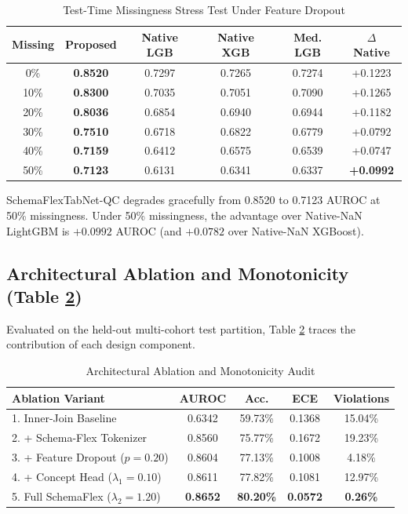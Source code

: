 \documentclass[journal]{IEEEtran}
\begin{document}
\begin{table}[t]
\caption{Test-Time Missingness Stress Test Under Feature Dropout}
\label{tab:missingness_stress}
\centering
\begin{tabular}{cccccc}
\toprule
\textbf{Missing} & \textbf{Proposed} & \textbf{Native LGB} & \textbf{Native XGB} & \textbf{Med. LGB} & \textbf{$\Delta$ Native} \\
\midrule
0\%  & \textbf{0.8520} & 0.7297 & 0.7265 & 0.7274 & +0.1223 \\
10\% & \textbf{0.8300} & 0.7035 & 0.7051 & 0.7090 & +0.1265 \\
20\% & \textbf{0.8036} & 0.6854 & 0.6940 & 0.6944 & +0.1182 \\
30\% & \textbf{0.7510} & 0.6718 & 0.6822 & 0.6779 & +0.0792 \\
40\% & \textbf{0.7159} & 0.6412 & 0.6575 & 0.6539 & +0.0747 \\
50\% & \textbf{0.7123} & 0.6131 & 0.6341 & 0.6337 & \textbf{+0.0992} \\
\bottomrule
\end{tabular}
\end{table}

SchemaFlexTabNet-QC degrades gracefully from 0.8520 to 0.7123 AUROC at 50\% missingness. Under 50\% missingness, the advantage over Native-NaN LightGBM is $+0.0992$ AUROC (and $+0.0782$ over Native-NaN XGBoost).

\subsection{Architectural Ablation and Monotonicity (Table \ref{tab:ablation_study})}
Evaluated on the held-out multi-cohort test partition, Table \ref{tab:ablation_study} traces the contribution of each design component.

\begin{table}[t]
\caption{Architectural Ablation and Monotonicity Audit}
\label{tab:ablation_study}
\centering
\begin{tabular}{lcccc}
\toprule
\textbf{Ablation Variant} & \textbf{AUROC} & \textbf{Acc.} & \textbf{ECE} & \textbf{Violations} \\
\midrule
1. Inner-Join Baseline        & 0.6342 & 59.73\% & 0.1368 & 15.04\% \\
2. + Schema-Flex Tokenizer    & 0.8560 & 75.77\% & 0.1672 & 19.23\% \\
3. + Feature Dropout ($p=0.20$)& 0.8604 & 77.13\% & 0.1008 & 4.18\% \\
4. + Concept Head ($\lambda_1=0.10$) & 0.8611 & 77.82\% & 0.1081 & 12.97\% \\
5. Full SchemaFlex ($\lambda_2=1.20$)& \textbf{0.8652} & \textbf{80.20\%} & \textbf{0.0572} & \textbf{0.26\%} \\
\bottomrule
\end{tabular}
\end{table}
\end{document}
